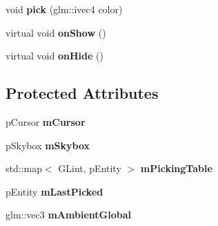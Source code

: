 \begin{DoxyCompactItemize}
\item 
\hypertarget{classfillwave_1_1models_1_1Scene_a3d2a3fd22970c071752e3651e17b02d6}{}void {\bfseries pick} (glm\+::ivec4 color)\label{classfillwave_1_1models_1_1Scene_a3d2a3fd22970c071752e3651e17b02d6}

\item 
\hypertarget{classfillwave_1_1models_1_1Scene_a135cf8963d11068d993391984d4373fa}{}virtual void {\bfseries on\+Show} ()\label{classfillwave_1_1models_1_1Scene_a135cf8963d11068d993391984d4373fa}

\item 
\hypertarget{classfillwave_1_1models_1_1Scene_a34a4e6a4aff2e7cfe397a11997c60e0f}{}virtual void {\bfseries on\+Hide} ()\label{classfillwave_1_1models_1_1Scene_a34a4e6a4aff2e7cfe397a11997c60e0f}

\end{DoxyCompactItemize}
\subsection*{Protected Attributes}
\begin{DoxyCompactItemize}
\item 
\hypertarget{classfillwave_1_1models_1_1Scene_a606e8e0ca703fed82cdb8b015c56d2cf}{}p\+Cursor {\bfseries m\+Cursor}\label{classfillwave_1_1models_1_1Scene_a606e8e0ca703fed82cdb8b015c56d2cf}

\item 
\hypertarget{classfillwave_1_1models_1_1Scene_ab90e524d5d76d70cff7cd4b1757d518c}{}p\+Skybox {\bfseries m\+Skybox}\label{classfillwave_1_1models_1_1Scene_ab90e524d5d76d70cff7cd4b1757d518c}

\item 
\hypertarget{classfillwave_1_1models_1_1Scene_a3742ab0816f18bca2ac953a23a98de88}{}std\+::map$<$ G\+Lint, p\+Entity $>$ {\bfseries m\+Picking\+Table}\label{classfillwave_1_1models_1_1Scene_a3742ab0816f18bca2ac953a23a98de88}

\item 
\hypertarget{classfillwave_1_1models_1_1Scene_a104ca8e33c2e141d265a6ca892edc10c}{}p\+Entity {\bfseries m\+Last\+Picked}\label{classfillwave_1_1models_1_1Scene_a104ca8e33c2e141d265a6ca892edc10c}

\item 
\hypertarget{classfillwave_1_1models_1_1Scene_a0f751362efd72347c39b58f442a02b52}{}glm\+::vec3 {\bfseries m\+Ambient\+Global}\label{classfillwave_1_1models_1_1Scene_a0f751362efd72347c39b58f442a02b52}

\end{DoxyCompactItemize}


